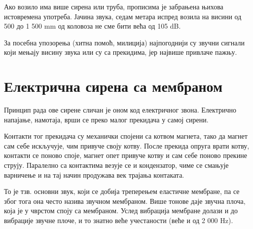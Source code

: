 \documentclass{report}
\begin{document}
Ако возило има више сирена или труба, прописима је забрањена њихова истовремена употреба. Јачина звука, седам метара испред возила на висини од 500 до 1 500 mm од коловоза не сме бити већа од 105 dB.

За посебна упозорења (хитна помоћ, милиција) најпогоднији су звучни сигнали који мењају висину звука или су са прекидима, јер највише привлаче пажњу.


\section{Електрична сирена са мембраном}

Принцип рада ове сирене сличан је оном код електричног звона. 
Електрично напајање, намотаја, врши се преко малог прекидача у самој 
сирени. 

Контакти тог прекидача су механички спојени са 
котвом магнета, тако да магнет сам себе искључује, чим привуче своју котву. 
После прекида опруга врати котву, контакти се поново споје, магнет опет привуче 
котву и сам себе поново прекине струју. Паралелно са контактима везује се и кондензатор, 
чиме се смањује варничење и на тај начин продужава век трајања контаката. 


То је тзв. основни звук, који се добија треперењем еластичне мембране, па се због тога она често назива звучном мембраном. Више тонове даје звучна плоча, која је у чврстом споју са мембраном. Услед вибрација мембране долази и до вибрације звучне плоче, и то знатно веће учестаности (веће и од 2 000 Hz).


\end{document}
